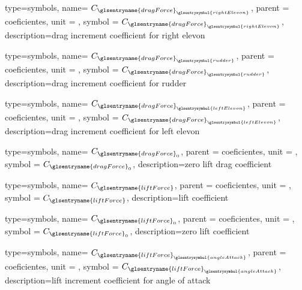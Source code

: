 {type=symbols,
    name= \ensuremath{C_{{\glsentryname{dragForce}}_{\glsentrysymbol{rightElevon}}}},
    parent = {coeficientes},
    unit = \unexpanded{},
    symbol = \ensuremath{C_{{\glsentryname{dragForce}}_{\glsentrysymbol{rightElevon}}}},
    description={drag increment coefficient for right elevon}
}


{type=symbols,
    name= \ensuremath{C_{{\glsentryname{dragForce}}_{\glsentrysymbol{rudder}}}},
    parent = {coeficientes},
    unit = \unexpanded{},
    symbol = \ensuremath{C_{{\glsentryname{dragForce}}_{\glsentrysymbol{rudder}}}},
    description={drag increment coefficient for rudder}
}


{type=symbols,
    name= \ensuremath{C_{{\glsentryname{dragForce}}_{\glsentrysymbol{leftElevon}}}},
    parent = {coeficientes},
    unit = \unexpanded{},
    symbol = \ensuremath{C_{{\glsentryname{dragForce}}_{\glsentrysymbol{leftElevon}}}},
    description={drag increment coefficient for left elevon}
}







{type=symbols,
    name= \ensuremath{C_{{\glsentryname{dragForce}}_{0}}},
    parent = {coeficientes},
    unit = \unexpanded{},
    symbol = \ensuremath{C_{{\glsentryname{dragForce}}_{0}}},
    description={zero lift drag coefficient}
}

{type=symbols,
    name= \ensuremath{C_{\glsentryname{liftForce}}},
    parent = {coeficientes},
    unit = \unexpanded{},
    symbol = \ensuremath{C_{\glsentryname{liftForce}}},
    description={lift coefficient}
}

{type=symbols,
    name= \ensuremath{C_{\glsentryname{liftForce}_{0}}},
    parent = {coeficientes},
    unit = \unexpanded{},
    symbol = \ensuremath{C_{\glsentryname{liftForce}_{0}}},
    description={zero lift coefficient}
}

{type=symbols,
    name= \ensuremath{C_{{\glsentryname{liftForce}}_{\glsentrysymbol{angleAttack}}}},
    parent = {coeficientes},
    unit = \unexpanded{},
    symbol = \ensuremath{C_{{\glsentryname{liftForce}}_{\glsentrysymbol{angleAttack}}}},
    description={lift increment coefficient for angle of attack}
}

